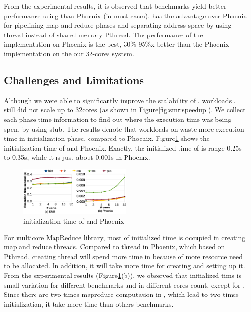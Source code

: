 From the experimental results, it is observed that benchmarks yield better performance using \myds than Phoenix (in most cases). 
\myds has the advantage over Phoenix for pipelining map and reduce phases and separating address space by using \myth thread instead of shared memory Pthread. 
The performance of the  implementation on Phoenix is the best, 30\%-95\%x better than the Phoenix implementation on the our 32-cores system.

\subsection{ Challenges and Limitations}
Although we were able to significantly improve the scalability of \myds, 
workloads ,  still did not scale up to 32cores (as shown in Figure\ref{fig:smr:speedup}). 
We collect each phase time information to find out where the execution time was being spent by using stub. 
The results denote that workloads on \myds waste more execution time in initialization phase, compared to Phoenix.
Figure\ref{fig:env:init} shows the initialization time of \myds and Phoenix.
Exactly, the initialized time of \myds is range 0.25s to 0.35s, while it is just about 0.001s in Phoenix.
\begin{figure}[!h!t]  
	\centering
	\includegraphics[width=0.5\textwidth]{eps/env_init.eps}
	\caption{initialization time of \myds and Phoenix}
	\label{fig:env:init}
\end{figure}


For multicore MapReduce library, most of initialized time is occupied in creating map and reduce threads.
Compared to thread in Phoenix, which based on Pthread, creating thread will spend more time in \myds because of more resource need to be allocated.
In addition, it will take more time for creating  and setting up it.
From the experimental results (Figure\ref{fig:env:init}(b)), we observed that initialized time is small variation for different benchmarks and in different cores count, except for .
Since there are two times mapreduce computation in , which lead to two times initialization, it take more time than others benchmarks.
  


